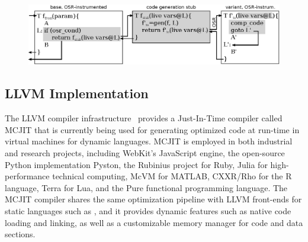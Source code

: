 
\ifdefined\noauthorea
\begin{figure}[t]
\begin{center}
\includegraphics[width=1.0\textwidth]{figures/osr-open/osr-open.eps}
\caption{\protect}
\end{center}
\end{figure}
\fi

\subsection{LLVM Implementation}
\label{ss:osrkit-implementation}

The LLVM compiler infrastructure~\cite{Lattner04} provides a Just-In-Time compiler called MCJIT that is currently being used for generating optimized code at run-time in virtual machines for dynamic languages. MCJIT is employed in both industrial and research projects, including WebKit's JavaScript engine, the open-source Python implementation Pyston, the Rubinius project for Ruby, Julia for high-performance technical computing, McVM for MATLAB, CXXR/Rho for the R language, Terra for Lua, and the Pure functional programming language. The MCJIT compiler shares the same optimization pipeline with LLVM front-ends for static languages such as \clang, and it provides dynamic features such as native code loading and linking, as well as a customizable memory manager for code and data sections.


